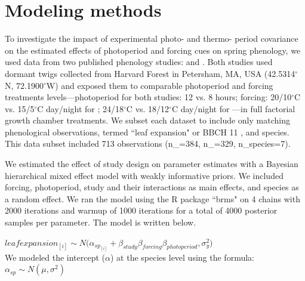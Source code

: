 \documentclass[11pt]{article}
\begin{document}
\section*{Modeling methods}
To investigate the impact of experimental photo- and thermo- period covariance on the estimated effects of photoperiod and forcing cues on spring phenology, we used data from two published phenology studies: \cite{Flynn2018} and \cite{Buonaiuto:2021ug}. Both studies used dormant twigs collected from Harvard Forest in Petersham, MA, USA (42.5314$^{\circ}$N, 72.1900$^{\circ}$W)  and exposed them to comparable photoperiod and forcing treatments levels---photoperiod for both studies: 12 vs. 8 hours; forcing: 20/10$^{\circ}$C vs. 15/5$^{\circ}$C day/night for \citet{Flynn2018}; 24/18$^{\circ}$C vs. 18/12$^{\circ}$C day/night for \citet{Buonaiuto:2021ug}---in full factorial growth chamber treatments. We subset each dataset to include only matching phenological observations, termed ``leaf expansion" or BBCH 11 \citep{Finn2007}, and species. This data subset included 713 observations (n_{\cite{Flynn2018}}=384, n_{\cite{Buonaiuto:2021ug}}=329, n_{species}=7).

We estimated the effect of study design on parameter estimates with a Bayesian hierarchical mixed effect model with weakly informative priors. %
We included forcing, photoperiod, study and their interactions as main effects, and species as a random effect. We ran the model using the R package ``brms" \citep{Burkner2018} on 4 chains with 2000 iterations and warmup of 1000 iterations for a total of 4000 posterior samples per parameter. The model is written below.

$leafexpansion_{[i]} \sim N(\alpha_{sp_{[i]}}+\beta_{study} $\times$ \beta_{forcing} $\times$ \beta_{photoperiod}, \sigma_y^2)$\\

We modeled the intercept ($\alpha$) at the species level using the formula:\\

$\alpha_{sp} \sim N(\mu,\sigma^2)$\\

\end{document}
